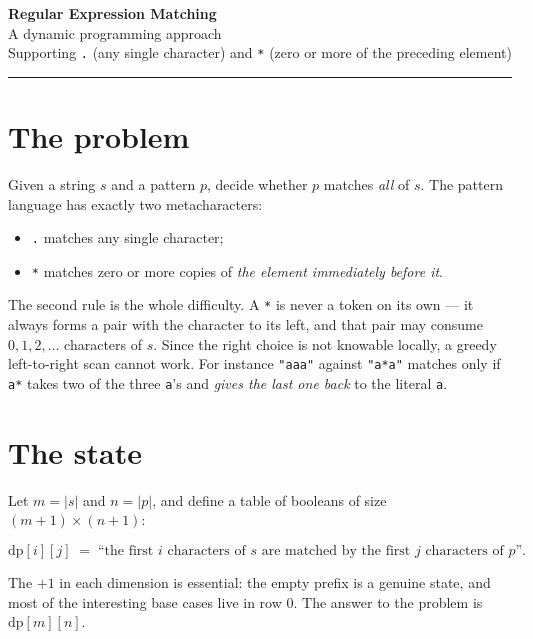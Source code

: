 \documentclass[11pt,a4paper]{article}
\begin{document}
\begin{center}
  {\LARGE\bfseries\color{accent} Regular Expression Matching}\\[2pt]
  {\large A dynamic programming approach}\\[6pt]
  {\small Supporting \texttt{.} (any single character) and \texttt{*} (zero or more of the preceding element)}
\end{center}

\vspace{4pt}
\hrule
\vspace{10pt}

\section{The problem}

Given a string $s$ and a pattern $p$, decide whether $p$ matches \emph{all} of $s$. The pattern
language has exactly two metacharacters:

\begin{itemize}
  \item \texttt{.} matches any single character;
  \item \texttt{*} matches zero or more copies of \emph{the element immediately before it}.
\end{itemize}

The second rule is the whole difficulty. A \texttt{*} is never a token on its own --- it always
forms a pair with the character to its left, and that pair may consume $0, 1, 2, \dots$ characters
of $s$. Since the right choice is not knowable locally, a greedy left-to-right scan cannot work.
For instance \texttt{"aaa"} against \texttt{"a*a"} matches only if \texttt{a*} takes two of the
three \texttt{a}'s and \emph{gives the last one back} to the literal \texttt{a}.

\section{The state}

Let $m = |s|$ and $n = |p|$, and define a table of booleans of size $(m+1) \times (n+1)$:

\[
  \mathrm{dp}[i][j] \;=\;
  \text{``the first $i$ characters of $s$ are matched by the first $j$ characters of $p$''.}
\]

The $+1$ in each dimension is essential: the empty prefix is a genuine state, and most of the
interesting base cases live in row $0$. The answer to the problem is $\mathrm{dp}[m][n]$.
\end{document}

